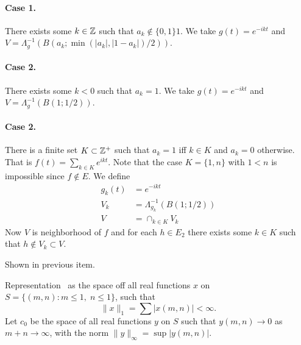 \begin{enumerate}
\begin{itemize}
\paragraph{Case 1.} There exists some \(k\in\mathbb{Z}\) such that \(a_k\notin\{0,1\}1\).
We take \(g(t)=e^{-ikt}\) and
\(V = \Lambda_g^{-1}\left(B(a_k;\min(|a_k|,|1-a_k|)/2)\right)\).

\paragraph{Case 2.} There exists some \(k<0\) such that \(a_k=1\).
We take \(g(t)=e^{-ikt}\) and \(V = \Lambda_g^{-1}(B(1;1/2))\).

\paragraph{Case 2.} There is a finite set \(K\subset \mathbb{Z}^+\)
such that \(a_k = 1\) iff \(k\in K\) and \(a_k = 0\) otherwise.
That is \(f(t) = \sum_{k\in K} e^{ikt}\).
Note that the case \(K=\{1,n\}\) with \(1<n\) is impossible
since \(f\notin E\).
We define
\begin{align*}
g_k(t) &= e^{-ikt} \\
V_k &= \Lambda_{g_k}^{-1}(B(1;1/2)) \\
V &= \cap_{k\in K} V_k
\end{align*}
Now $V$ is neighborhood of $f$ and for each \(h\in E_2\)
there exists some \(k\in K\) such that \(h\notin V_k\subset V\).

Shown in previous item.
\end{itemize}

\begin{excopy}
Representation \ellone\ as the space off all real functions $x$ on
\(S = \{(m,n): m\leq 1,\; n \leq 1\}\), such that
\begin{equation*}
\|x\|_1 = \sum |x(m,n)| < \infty.
\end{equation*}
Let \(c_0\) be the space of all real functions $y$ on $S$ such that
\(y(m,n) \to 0\) as \(m+n\to\infty\),
with the norm \(\|y\|_\infty = \sup |y(m,n)|\).


\end{excopy}
\end{enumerate}
